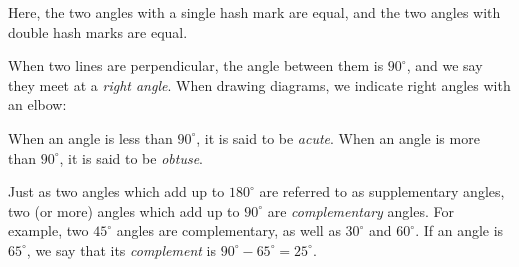 Here, the two angles with a single hash mark are equal, and the two angles with 
double hash marks are equal.

When two lines are perpendicular, the angle between them is $90^\circ$, and we 
say they meet at a \emph{right angle}. When drawing diagrams, we indicate right
angles with an elbow:

\begin{center}
\end{center}

 
When an angle is less than $90^\circ$, it is said to be
\emph{acute}. When an angle is more than $90^\circ$, it is said to be
\emph{obtuse}.

Just as two angles which add up to $180^\circ$ are referred to as supplementary angles,
two (or more) angles which add up to $90^\circ$ are \emph{complementary} angles. For example, two $45^\circ$ angles are complementary, as well as $30^\circ$ and $60^\circ$. If an angle is $65^\circ$, we say that its \emph{complement} is $90^\circ-65^\circ=25^\circ$.

\begin{center}
\hspace{2cm}
\end{center}


